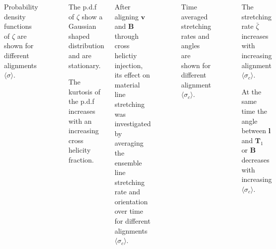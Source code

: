 \documentclass[20pt, a0paper, portrait, margin=15mm, innermargin=15mm,
     blockverticalspace=15mm, colspace=15mm, subcolspace=8mm]{tikzposter} %
\newcommand{\va}[1]{\bm{#1}}
\newcommand{\plot}[3]{
\begin{figure}[H]
    \centering
    \scriptsize
    \scalebox{1.3}{}
    \caption{\footnotesize{#2}}
    \label{#3}
\end{figure}
}
\begin{document}
\begin{columns}
{\begin{minipage}[t]{20cm}
                    \plot{figures/histograms/mhd_zeta_histo_t20}
						{Probability density functions of $\zeta$ are shown for
                        different alignments $\langle \sigma \rangle$.}
						{histo}

                    \begin{itemsposter}
                        \item The p.d.f of $\zeta $ show
                              a Gaussian shaped distribution and are stationary.

                        \vspace{0.5cm}

                        \item The kurtosis of the p.d.f increases with an increasing
                              cross helicity fraction.
                    \end{itemsposter}



                     After aligning $\va{v}$ and $\va{B}$ through cross helictiy
                     injection, its effect on material line stretching was
                     investigated by averaging the ensemble line stretching
                     rate and orientation over time for different alignments $\langle
                     \sigma_c \rangle $.

                    \plot{figures/line_xhel_scaling_128}
						{Time averaged stretching rates and angles are shown for
                        different alignment $\langle \sigma_c \rangle$.}
						{xhel_scaling}

                    \begin{itemsposter}
                        \item The stretching rate $\bar{\zeta}$ increases with
                            increasing alignment $\langle \sigma_c \rangle$.

                        \vspace{0.5cm}

                    \item At the same time the angle between $\va{l}$ and
                        $\va{T}_1$ or $\va{B}$ decreases with
                            increasing $\langle \sigma_c \rangle$.

                    \end{itemsposter}

                
            \end{minipage}
         
        }
	
	\end{columns}
	
\end{document}
